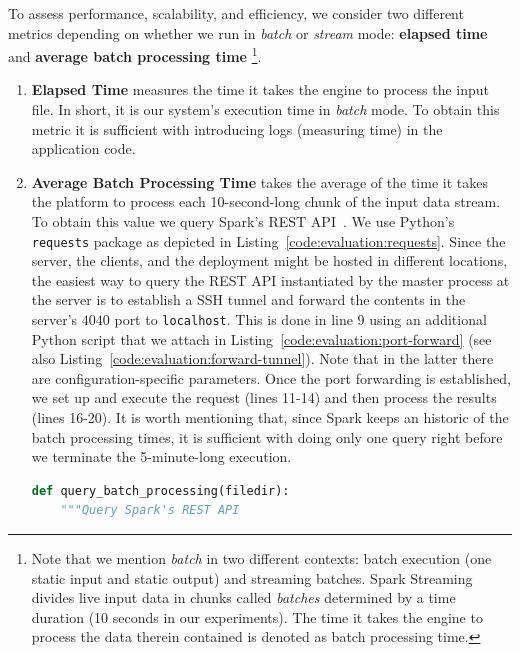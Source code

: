 To assess performance, scalability, and efficiency, we consider two different metrics depending on whether we run in \emph{batch} or \emph{stream} mode: \textbf{elapsed time} and \textbf{average batch processing time}
\footnote{
Note that we mention \textit{batch} in two different contexts: batch execution (one static input and static output) and streaming batches.
Spark Streaming divides live input data in chunks called \emph{batches} determined by a time duration (10 seconds in our experiments).
The time it takes the engine to process the data therein contained is denoted as batch processing time.}.
\begin{enumerate}
    \item \textbf{Elapsed Time} measures the time it takes the engine to process the input file. In short, it is our system's execution time in \emph{batch} mode. To obtain this metric it is sufficient with introducing logs (measuring time) in the application code.
    \item \textbf{Average Batch Processing Time} takes the average of the time it takes the platform to process each 10-second-long chunk of the input data stream. To obtain this value we query Spark's REST API~\cite{spark-rest-api}. We use Python's \texttt{requests} package as depicted in Listing~\ref{code:evaluation:requests}. Since the server, the clients, and the deployment might be hosted in different locations, the easiest way to query the REST API instantiated by the master process at the server is to establish a SSH tunnel and forward the contents in the server's $4040$ port to \texttt{localhost}. This is done in line 9 using an additional Python script that we attach in Listing~\ref{code:evaluation:port-forward} (see also Listing~\ref{code:evaluation:forward-tunnel}). Note that in the latter there are configuration-specific parameters. Once the port forwarding is established, we set up and execute the request (lines 11-14) and then process the results (lines 16-20). It is worth mentioning that, since Spark keeps an historic of the batch processing times, it is sufficient with doing only one query right before we terminate the 5-minute-long execution.
\begin{lstlisting}[language=Python,caption={Snippet illustrating a query to Spark's REST API.},label=code:evaluation:requests]
def query_batch_processing(filedir):
    """Query Spark's REST API 


\end{lstlisting}
\end{enumerate}
